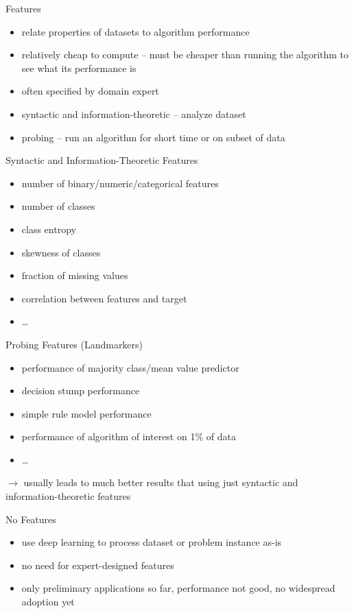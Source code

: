 \begin{frame}[c]{Features}
\begin{itemize}
\item relate properties of datasets to algorithm performance
\item relatively cheap to compute -- must be cheaper than running the algorithm
    to see what its performance is
\item often specified by domain expert
\item syntactic and information-theoretic -- analyze dataset
\item probing -- run an algorithm for short time or on subset of data
\end{itemize}
\end{frame}

\begin{frame}[c]{Syntactic and Information-Theoretic Features}
    \begin{itemize}
        \item number of binary/numeric/categorical features
        \item number of classes
        \item class entropy
        \item skewness of classes
        \item fraction of missing values
        \item correlation between features and target
        \item \ldots
    \end{itemize}
\end{frame}

\begin{frame}[c]{Probing Features (Landmarkers)}
    \begin{itemize}
        \item performance of majority class/mean value predictor
        \item decision stump performance
        \item simple rule model performance
        \item performance of algorithm of interest on 1\% of data
        \item \ldots
    \end{itemize}
    $\rightarrow$ usually leads to much better results that using just syntactic
    and information-theoretic features
\end{frame}

\begin{frame}[c]{No Features}
    \begin{itemize}
        \item use deep learning to process dataset or problem instance as-is
        \item no need for expert-designed features
        \item only preliminary applications so far, performance not good, no widespread adoption yet
    \end{itemize}
\end{frame}


